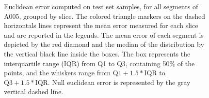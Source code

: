 \begin{figure}
\centering
{}
\caption{Euclidean error computed on test set samples, for all segments of A005, grouped by slice. The colored triangle markers on the dashed horizontals lines represent the mean error measured for each slice and are reported in the legends. The mean error of each segment is depicted by the red diamond and the median of the distribution by the vertical black line inside the boxes. The box represents the interquartile range (IQR) from Q1 to Q3, containing 50\% of the points, and the whiskers range from $\text{Q1} + 1.5 * \text{IQR}$ to $\text{Q3} + 1.5 * \text{IQR}$. Null euclidean error is represented by the gray vertical dashed line.}
\label{fig:3d_err_per_slice_seg}       %
\end{figure}

